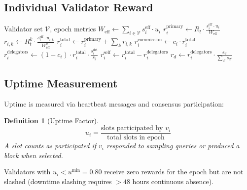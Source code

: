 \documentclass[11pt,a4paper]{article}
\newtheorem{definition}{Definition}
\begin{document}
\subsection{Individual Validator Reward}

\begin{algorithm}[H]
\caption{Epoch Reward Distribution}
\label{alg:rewards}
\begin{algorithmic}[1]
\Require Validator set $\mathcal{V}$, epoch metrics
\State $W_{\text{eff}} \gets \sum_{i \in \mathcal{V}} s_i^{\text{eff}} \cdot u_i$
    \State {}
    \State $r_i^{\text{primary}} \gets R_t \cdot \frac{s_i^{\text{eff}} \cdot u_i}{W_{\text{eff}}}$
    \State {}
        \State $r_{i,k} \gets R_t^k \cdot \frac{s_i^{\text{eff}} \cdot u_{i,k}}{W_{\text{eff}}^k}$
    \EndFor
    \State $r_i^{\text{total}} \gets r_i^{\text{primary}} + \sum_{k} r_{i,k}$
    \State {}
    \State $r_i^{\text{commission}} \gets c_i \cdot r_i^{\text{total}}$
    \State $r_i^{\text{delegators}} \gets (1 - c_i) \cdot r_i^{\text{total}} \cdot \frac{s_i^{\text{del}}}{s_i}$
    \State $r_i^{\text{self}} \gets r_i^{\text{total}} - r_i^{\text{delegators}}$
    \State {}
        \State $r_d \gets r_i^{\text{delegators}} \cdot \frac{s_d}{\sum_{d'} s_{d'}}$
    \EndFor
\EndFor
\end{algorithmic}
\end{algorithm}

\subsection{Uptime Measurement}

Uptime is measured via heartbeat messages and consensus participation:

\begin{definition}[Uptime Factor]
\begin{equation}
    u_i = \frac{\text{slots participated by } v_i}{\text{total slots in epoch}}
\end{equation}
A slot counts as participated if $v_i$ responded to sampling queries or produced a block when selected.
\end{definition}

Validators with $u_i < u^{\min} = 0.80$ receive zero rewards for the epoch but are not slashed (downtime slashing requires $> 48$ hours continuous absence).
\end{document}
